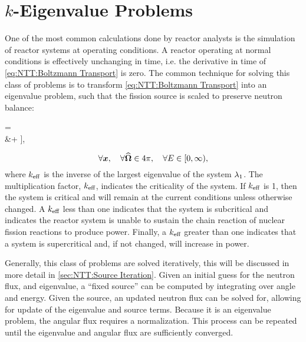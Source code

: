 {{    }
    \section{\texorpdfstring{$k$}{k}-Eigenvalue Problems}{\label{sec:NTT:k-Eigenvalue Problems}
        One of the most common calculations done by reactor analysts is the simulation of reactor systems at operating conditions.
        A reactor operating at normal conditions is effectively unchanging in time, i.e. the derivative in time of \cref{eq:NTT:Boltzmann Transport} is zero.
        The common technique for solving this class of problems is to transform \cref{eq:NTT:Boltzmann Transport} into an eigenvalue problem, such that the fission source is scaled to preserve neutron balance:
        \begin{aequation}\label{eq:NTT:Eigenvalue Transport Problem}
                \Big[\dir\vdot\grad &+ \xst\Big]\aflux
                    =
                    \rfourpi\Bigg[
                        \source\\
                        &+ \intl[0][\infty]\intl[\fourpi]\xss\aflux[\loc][\dirprime][\Eprime]\ddirprime\dif{\Eprime}\\\qquad\qquad
                        &+ \spect\intl[0][\infty]\nufis\sflux[\loc][\Eprime]\dif{\Eprime}
                    \Bigg],
        \end{aequation}
        \begin{equation*}
            \forall\boldsymbol{x}, \quad \forall\boldsymbol{\widehat{\Omega}}\in4\pi,\quad \forall E\in[0,\infty),
        \end{equation*}
        where $k_{\text{eff}}$ is the inverse of the largest eigenvalue of the system $\lambda_1$.
        The multiplication factor, $k_{\text{eff}}$, indicates the criticality of the system.
        If $k_{\text{eff}}$ is 1, then the system is critical and will remain at the current conditions unless otherwise changed.
        A $k_{\text{eff}}$ less than one indicates that the system is subcritical and indicates the reactor system is unable to sustain the chain reaction of nuclear fission reactions to produce power.
        Finally, a $k_{\text{eff}}$ greater than one indicates that a system is supercritical and, if not changed, will increase in power.

        Generally, this class of problems are solved iteratively, this will be discussed in more detail in \cref{sec:NTT:Source Iteration}.
        Given an initial guess for the neutron flux, and eigenvalue, a ``fixed source'' can be computed by integrating over angle and energy.
        Given the source, an updated neutron flux can be solved for, allowing for update of the eigenvalue and source terms.
        Because it is an eigenvalue problem, the angular flux requires a normalization.
        This process can be repeated until the eigenvalue and angular flux are sufficiently converged.

}}
